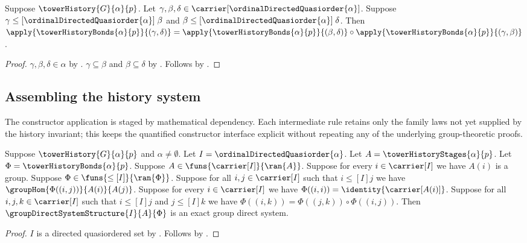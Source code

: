 \begin{proposition}\label{tower_history_bond_family_composition}
    Suppose $\towerHistory{G}{\alpha}{p}$.
    Let $\gamma,\beta,\delta\in
        \carrier[\ordinalDirectedQuasiorder{\alpha}]$.
    Suppose $\gamma\mathrel{
        \leq[\ordinalDirectedQuasiorder{\alpha}]}\beta$ and
        $\beta\mathrel{
        \leq[\ordinalDirectedQuasiorder{\alpha}]}\delta$.
    Then $\apply{\towerHistoryBonds{\alpha}{p}}{(\gamma,\delta)}
        =\apply{\towerHistoryBonds{\alpha}{p}}{(\beta,\delta)}\circ
            \apply{\towerHistoryBonds{\alpha}{p}}{(\gamma,\beta)}$.
\end{proposition}
\begin{proof}
    $\gamma,\beta,\delta\in\alpha$ by
        .
    $\gamma\subseteq\beta$ and $\beta\subseteq\delta$ by
        .
    Follows by
        .
\end{proof}

\subsection{Assembling the history system}

The constructor application is staged by mathematical dependency.  Each
intermediate rule retains only the family laws not yet supplied by the history
invariant; this keeps the quantified constructor interface explicit without
repeating any of the underlying group-theoretic proofs.

\begin{theorem}\label{tower_history_system_after_index}
    Suppose $\towerHistory{G}{\alpha}{p}$ and
        $\alpha\neq\emptyset$.
    Let $I=\ordinalDirectedQuasiorder{\alpha}$.
    Let $A=\towerHistoryStages{\alpha}{p}$.
    Let $\Phi=\towerHistoryBonds{\alpha}{p}$.
    Suppose $A\in\funs{\carrier[I]}{\ran{A}}$.
    Suppose for every $i\in\carrier[I]$ we have $A(i)$ is a group.
    Suppose $\Phi\in\funs{\leq[I]}{\ran{\Phi}}$.
    Suppose for all $i,j\in\carrier[I]$ such that
        $i\mathrel{\leq[I]}j$ we have
        $\groupHom{\Phi((i,j))}{A(i)}{A(j)}$.
    Suppose for every $i\in\carrier[I]$ we have
        $\Phi((i,i))=\identity{\carrier[A(i)]}$.
    Suppose for all $i,j,k\in\carrier[I]$ such that
        $i\mathrel{\leq[I]}j$ and $j\mathrel{\leq[I]}k$ we have
        $\Phi((i,k))=\Phi((j,k))\circ\Phi((i,j))$.
    Then $\groupDirectSystemStructure{I}{A}{\Phi}$ is an exact
        group direct system.
\end{theorem}
\begin{proof}
    $I$ is a directed quasiordered set by
        .
    Follows by .
\end{proof}

